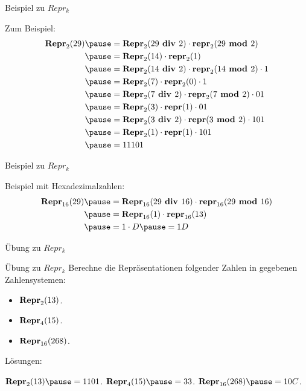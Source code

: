 \begin{frame}{Beispiel zu $Repr_k$}
	
	\pause Zum Beispiel: \p 
	\begin{align*}
	\fRepr_2(29) \p &= \fRepr_2(29 \fdiv 2) \cdot \frepr_2(29 \fmod 2)  \\
	\p &= \fRepr_2(14) \cdot \frepr_2(1)\\
	\p &= \fRepr_2(14 \fdiv 2) \cdot \frepr_2(14 \fmod 2) \cdot 1\\
	\p &= \fRepr_2(7) \cdot \frepr_2(0) \cdot 1\\
	\p &= \fRepr_2(7 \fdiv 2) \cdot \frepr_2(7 \fmod 2) \cdot 01\\
	\p &= \fRepr_2(3) \cdot \frepr(1) \cdot 01\\
	\p &= \fRepr_2(3 \fdiv 2) \cdot \frepr(3 \fmod 2) \cdot 101\\
	\p &= \fRepr_2(1) \cdot \frepr(1) \cdot 101\\
	\p &= 11101
	\end{align*}
\end{frame}
\newcommand{\uhd}{_{16}}

\begin{frame}{Beispiel zu $Repr_k$}

\pause Beispiel mit Hexadezimalzahlen: \p 
\begin{align*}
\fRepr\uhd (29) \p &= \fRepr\uhd (29 \fdiv 16) \cdot \frepr\uhd (29 \fmod 16)  \\
\p &= \fRepr\uhd (1) \cdot \frepr\uhd (13)\\
\p &= 1 \cdot D \p = 1D
\end{align*}
\end{frame}

\begin{frame}{Übung zu $Repr_k$}
	\begin{taskblock}{Übung zu $Repr_k$}
		Berechne die Repräsentationen folgender Zahlen in gegebenen Zahlensystemen:
		\begin{itemize}
			\item $\textbf{Repr}_2(13)$.
			\item $\textbf{Repr}_4(15)$.
			\item $\fRepr\uhd (268)$.
		\end{itemize}
	\end{taskblock}

	\pause Lösungen:
	\begin{itemize}
		\pitem $\fRepr_2(13) \p = 1101$.
		\pitem $\fRepr_4(15) \p = 33$.
		\pitem $\fRepr\uhd (268) \p = 10C$.
	\end{itemize}
\end{frame}

